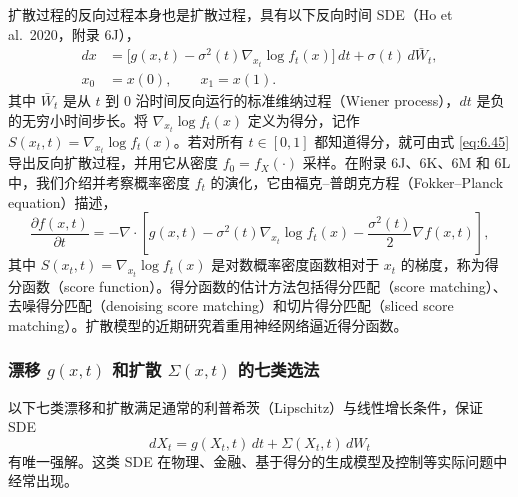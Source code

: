 扩散过程的反向过程本身也是扩散过程，具有以下反向时间 SDE（Ho et al.\ 2020，附录 6J），
\begin{equation*}
  \begin{aligned}
    dx &= \bigl[g(x,t)-\sigma^2(t)\nabla_{x_t}\log f_t(x)\bigr]\,dt+\sigma(t)\,d\bar W_t,\\
    x_0&=x(0),\qquad x_1=x(1).
  \end{aligned}
  \tag{6.46}\label{eq:6.46}
\end{equation*}
其中 $\bar W_t$ 是从 $t$ 到 0 沿时间反向运行的标准维纳过程（Wiener process），$dt$ 是负的无穷小时间步长。将 $\nabla_{x_t}\log f_t(x)$ 定义为得分，记作 $S(x_t,t)=\nabla_{x_t}\log f_t(x)$。若对所有 $t\in[0,1]$ 都知道得分，就可由式 \eqref{eq:6.45} 导出反向扩散过程，并用它从密度 $f_0=f_X(\cdot)$ 采样。在附录 6J、6K、6M 和 6L 中，我们介绍并考察概率密度 $f_t$ 的演化，它由福克–普朗克方程（Fokker–Planck equation）描述，
\begin{equation*}
  \frac{\partial f(x,t)}{\partial t}
  =-\nabla\cdot\left[g(x,t)-\sigma^2(t)\nabla_{x_t}\log f_t(x)
                     -\frac{\sigma^2(t)}{2}\nabla f(x,t)\right],
  \tag{6.47}\label{eq:6.47}
\end{equation*}
其中 $S(x_t,t)=\nabla_{x_t}\log f_t(x)$ 是对数概率密度函数相对于 $x_t$ 的梯度，称为得分函数（score function）。得分函数的估计方法包括得分匹配（score matching）、去噪得分匹配（denoising score matching）和切片得分匹配（sliced score matching）。扩散模型的近期研究着重用神经网络逼近得分函数。

\subsubsection{漂移 \texorpdfstring{$g(x,t)$}{g(x,t)} 和扩散 \texorpdfstring{$\Sigma(x,t)$}{Σ(x,t)} 的七类选法}

以下七类漂移和扩散满足通常的利普希茨（Lipschitz）与线性增长条件，保证 SDE
\begin{equation*}
  dX_t=g(X_t,t)\,dt+\Sigma(X_t,t)\,dW_t
  \tag{6.48}\label{eq:6.48}
\end{equation*}
有唯一强解。这类 SDE 在物理、金融、基于得分的生成模型及控制等实际问题中经常出现。

